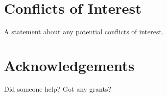 \documentclass{article}
\begin{document}
    \section*{Conflicts of Interest} %
        A statement about any potential conflicts of interest.

    \section*{Acknowledgements}
        Did someone help? Got any grants?

\end{document}
